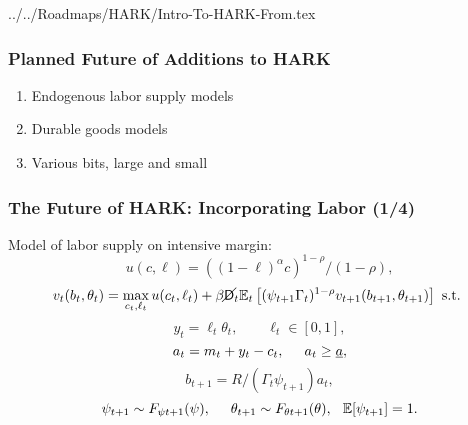 \documentclass[11ptt]{beamer}
\newcommand{\E}{\mathbb{E}}
\newcommand{\Die}{\mathsf{D}}
\newcommand{\Live}{\cancel{\Die}}
\begin{document}
\begin{verbatimwrite}{../../Roadmaps/HARK/Intro-To-HARK-From.tex}
\begin{frame}\label{HARKFuture}\frametitle{Planned Future of Additions to HARK}

  \begin{enumerate}
  \item Endogenous labor supply models  \hyperlink{LaborSupply}{}
  \item Durable goods models \hyperlink{DurableGoods}{}
  \item Various bits, large and small \hyperlink{StructuralChanges}{}
  \end{enumerate}
\end{frame}


\begin{frame}\label{LaborSupply}
\frametitle{The Future of HARK: Incorporating Labor (1/4)}
Model of labor supply on intensive margin:
\begin{equation*}
u(c,\ell) = ((1-\ell)^\alpha c)^{1-\rho}/(1-\rho),
\end{equation*}
\begin{equation*}
v_t(b_t,\theta_t) = \max_{c_t, \ell_t} u(c_t,\ell_t) + \beta \Live_t \E_t \left[(\psi_{t+1} \Gamma_t)^{1-\rho} v_{t+1}(b_{t+1},\theta_{t+1}) \right] \text{ s.t. }
\end{equation*}
\begin{equation*}
y_t = \ell_t \theta_t, \qquad \ell_t \in [0,1],
\end{equation*}
\begin{equation*}
a_t = m_t + y_t - c_t, \hspace{0.5cm} a_t \geq \underline{a},
\end{equation*}
\begin{equation*}
b_{t+1} = R/(\Gamma_t \psi_{t+1}) a_t, 
\end{equation*}
\begin{equation*}
\psi_{t+1} \sim F_{\psi t+1}(\psi), \hspace{0.5cm} \theta_{t+1} \sim F_{\theta t+1}(\theta), \hspace{0.25cm} \E[\psi_{t+1}] = 1.
\end{equation*}
\end{frame}



\end{verbatimwrite}
\end{document}
